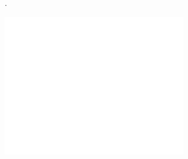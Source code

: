 
\maketitle\thispagestyle{empty}
\pagecolor{black}
.
\vspace{4cm}
\begin{center}
  \includegraphics[width=0.6\textwidth]{../general/logo.pdf}
\end{center}

\vspace*{2cm}
\begin{center}
  {\color{white} \Huge\docTitle}
\end{center}

\vspace*{1cm}
\begin{center}
  {\color{white} \Huge\productName}
\end{center}

\begin{center}
  {\color{white} \Huge\docSubTitle}
\end{center}

\afterpage{\nopagecolor}
\newpage
